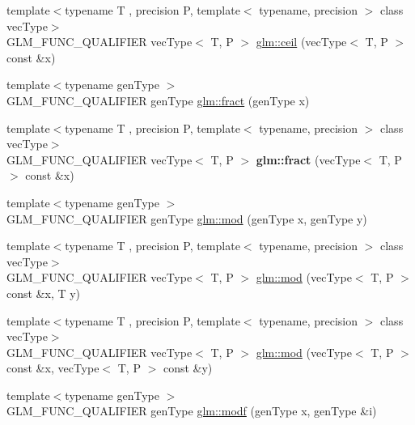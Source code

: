 \begin{DoxyCompactItemize}
\item 
{\footnotesize template$<$typename T , precision P, template$<$ typename, precision $>$ class vec\+Type$>$ }\\G\+L\+M\+\_\+\+F\+U\+N\+C\+\_\+\+Q\+U\+A\+L\+I\+F\+I\+ER vec\+Type$<$ T, P $>$ \hyperlink{group__core__func__common_ga9189b2bec45ff301923ea8f8dd157fb8}{glm\+::ceil} (vec\+Type$<$ T, P $>$ const \&x)
\item 
{\footnotesize template$<$typename gen\+Type $>$ }\\G\+L\+M\+\_\+\+F\+U\+N\+C\+\_\+\+Q\+U\+A\+L\+I\+F\+I\+ER gen\+Type \hyperlink{group__core__func__common_ga8ba89e40e55ae5cdf228548f9b7639c7}{glm\+::fract} (gen\+Type x)
\item 
{\footnotesize template$<$typename T , precision P, template$<$ typename, precision $>$ class vec\+Type$>$ }\\G\+L\+M\+\_\+\+F\+U\+N\+C\+\_\+\+Q\+U\+A\+L\+I\+F\+I\+ER vec\+Type$<$ T, P $>$ {\bfseries glm\+::fract} (vec\+Type$<$ T, P $>$ const \&x)
\item 
{\footnotesize template$<$typename gen\+Type $>$ }\\G\+L\+M\+\_\+\+F\+U\+N\+C\+\_\+\+Q\+U\+A\+L\+I\+F\+I\+ER gen\+Type \hyperlink{group__core__func__common_ga12201563ef902e3b07e0d1d7656efdb1}{glm\+::mod} (gen\+Type x, gen\+Type y)
\item 
{\footnotesize template$<$typename T , precision P, template$<$ typename, precision $>$ class vec\+Type$>$ }\\G\+L\+M\+\_\+\+F\+U\+N\+C\+\_\+\+Q\+U\+A\+L\+I\+F\+I\+ER vec\+Type$<$ T, P $>$ \hyperlink{group__gtc__integer_ga1d3f62c015315540cebf1f915b67dd9c}{glm\+::mod} (vec\+Type$<$ T, P $>$ const \&x, T y)
\item 
{\footnotesize template$<$typename T , precision P, template$<$ typename, precision $>$ class vec\+Type$>$ }\\G\+L\+M\+\_\+\+F\+U\+N\+C\+\_\+\+Q\+U\+A\+L\+I\+F\+I\+ER vec\+Type$<$ T, P $>$ \hyperlink{group__gtc__integer_ga689e2d9100af0bfc4d9954c96221095e}{glm\+::mod} (vec\+Type$<$ T, P $>$ const \&x, vec\+Type$<$ T, P $>$ const \&y)
\item 
{\footnotesize template$<$typename gen\+Type $>$ }\\G\+L\+M\+\_\+\+F\+U\+N\+C\+\_\+\+Q\+U\+A\+L\+I\+F\+I\+ER gen\+Type \hyperlink{group__core__func__common_ga85e33f139b8db1b39b590a5713b9e679}{glm\+::modf} (gen\+Type x, gen\+Type \&i)
\item 
\mbox{\label{func__common_8inl_a41834d29828f9832a3c79931c9043ccf}} 

\end{DoxyCompactItemize}
